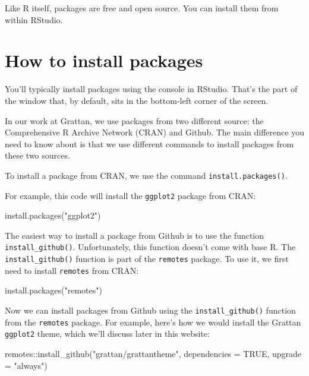 \documentclass[
]{book}
\newenvironment{Shaded}{\begin{snugshade}}{\end{snugshade}}
\newcommand{\AttributeTok}[1]{\textcolor[rgb]{0.77,0.63,0.00}{#1}}
\newcommand{\ConstantTok}[1]{\textcolor[rgb]{0.00,0.00,0.00}{#1}}
\newcommand{\FunctionTok}[1]{\textcolor[rgb]{0.00,0.00,0.00}{#1}}
\newcommand{\NormalTok}[1]{#1}
\newcommand{\SpecialCharTok}[1]{\textcolor[rgb]{0.00,0.00,0.00}{#1}}
\newcommand{\StringTok}[1]{\textcolor[rgb]{0.31,0.60,0.02}{#1}}
\begin{document}
Like R itself, packages are free and open source. You can install them from within RStudio.

\hypertarget{install-packages}{%
\section{How to install packages}\label{install-packages}}

You'll typically install packages using the console in RStudio. That's the part of the window that, by default, sits in the bottom-left corner of the screen.

In our work at Grattan, we use packages from two different source: the Comprehensive R Archive Network (CRAN) and Github. The main difference you need to know about is that we use different commands to install packages from these two sources.

To install a package from CRAN, we use the command \texttt{install.packages()}.

For example, this code will install the \texttt{ggplot2} package from CRAN:

\begin{Shaded}
\begin{Highlighting}[]
\FunctionTok{install.packages}\NormalTok{(}\StringTok{"ggplot2"}\NormalTok{)}
\end{Highlighting}
\end{Shaded}

The easiest way to install a package from Github is to use the function \texttt{install\_github()}. Unfortunately, this function doesn't come with base R. The \texttt{install\_github()} function is part of the \texttt{remotes} package. To use it, we first need to install \texttt{remotes} from CRAN:

\begin{Shaded}
\begin{Highlighting}[]
\FunctionTok{install.packages}\NormalTok{(}\StringTok{"remotes"}\NormalTok{)}
\end{Highlighting}
\end{Shaded}

Now we can install packages from Github using the \texttt{install\_github()} function from the \texttt{remotes} package. For example, here's how we would install the Grattan \texttt{ggplot2} theme, which we'll discuss later in this website:

\begin{Shaded}
\begin{Highlighting}[]
\NormalTok{remotes}\SpecialCharTok{::}\FunctionTok{install\_github}\NormalTok{(}\StringTok{"grattan/grattantheme"}\NormalTok{, }\AttributeTok{dependencies =} \ConstantTok{TRUE}\NormalTok{, }\AttributeTok{upgrade =} \StringTok{"always"}\NormalTok{)}
\end{Highlighting}
\end{Shaded}
\end{document}
